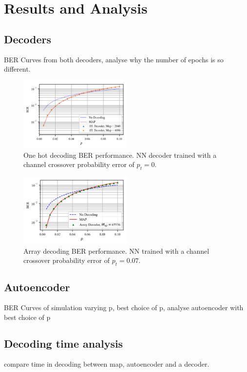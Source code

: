 \documentclass[conference]{IEEEtran}
\begin{document}
\section{Results and Analysis}

\subsection{Decoders}
BER Curves from both decoders, analyse why the number of epochs is so different. 

\begin{figure}[!ht]
  \centering
    \includegraphics[width=0.5\textwidth]{images/MAP_MLNN1H_p_0}
    \caption{One hot decoding BER performance. NN decoder trained with a channel crossover probability error of $p_t=0$.}\label{fig:1HD}
\end{figure}

\begin{figure}[!ht]
  \centering
    \includegraphics[width=0.5\textwidth]{images/20190529-142119_MAP_MLNN_Mep_65536}
    \caption{Array decoding BER performance. NN trained with a channel crossover probability error of $p_t=0.07$.}\label{fig:ArrayD}
\end{figure}

\subsection{Autoencoder}
BER Curves of simulation varying p, best choice of p, analyse autoencoder with best choice of p


\subsection{Decoding time analysis}
compare time in decoding between map, autoencoder and a decoder.
\end{document}
